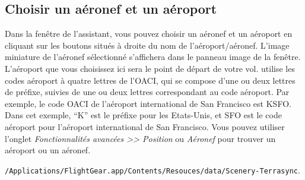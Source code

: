 {{\subsection{Choisir un a\'{e}ronef et un a\'{e}roport}
Dans la fen\^{e}tre de l'assistant, vous pouvez choisir un a\'{e}ronef et un a\'{e}roport en cliquant sur les boutons situ\'{e}s \`{a} droite du nom de l'a\'{e}roport/a\'{e}ronef. L'image miniature de l'a\'{e}ronef s\'{e}lectionn\'{e} s'affichera dans le panneau image de la fen\^{e}tre. L'a\'{e}roport que vous choisissez ici sera le point de d\'{e}part de votre vol. \FlightGear{} utilise les codes a\'{e}roport \`{a} quatre lettres de l'OACI, qui se compose d'une ou deux lettres de pr\'{e}fixe, suivies de une ou deux lettres correspondant au code a\'{e}roport. Par exemple, le code OACI de l'a\'{e}roport international de San Francisco est KSFO. Dans cet exemple, ``K'' est le pr\'{e}fixe pour les Etats-Unis, et SFO est le code a\'{e}roport pour l'a\'{e}roport international de San Francisco. Vous pouvez utiliser l'onglet \textit{Fonctionnalit\'{e}s avanc\'{e}es >> Position} ou \textit{A\'{e}ronef} pour trouver un a\'{e}roport ou un a\'{e}ronef.
}{}

\texttt{/Applications/FlightGear.app/Contents/Resouces/data/Scenery-Terrasync}. 

}
